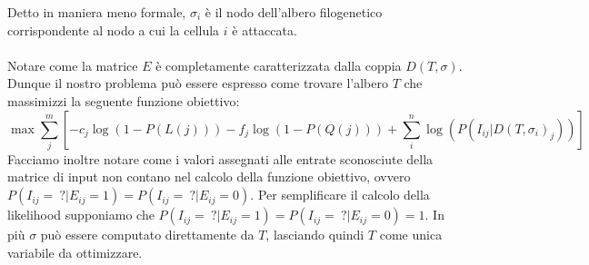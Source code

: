 \documentclass[12pt]{report}
\begin{document}
  Detto in maniera meno formale, ${\sigma}_{i}$ è il nodo dell'albero filogenetico corrispondente al nodo a cui la cellula $i$ è attaccata.\\\\
  Notare come la matrice $E$ è completamente caratterizzata dalla coppia $D(T, \sigma)$.
  Dunque il nostro problema può essere espresso come trovare l'albero $T$ che massimizzi la seguente funzione obiettivo:
  \[
    \max{\sum_{j}^{m}[-c_{j}\log(1-P(L(j)))-f_{j}\log(1-P(Q(j)))+\sum_{i}^{n}\log(P(I_{ij}|D(T, \sigma_{i})_{j}))]}
  \]
  Facciamo inoltre notare come i valori assegnati alle entrate sconosciute della matrice di input non contano nel calcolo della funzione obiettivo, ovvero $P(I_{ij}=\ ?|E_{ij}=1)=P(I_{ij}=\ ?|E_{ij}=0)$. Per semplificare il calcolo della likelihood supponiamo che $P(I_{ij}=\ ?|E_{ij}=1)=P(I_{ij}=\ ?|E_{ij}=0)=1$.
  In più $\sigma$ può essere computato direttamente da $T$, lasciando quindi $T$ come unica variabile da ottimizzare.
\end{document}
